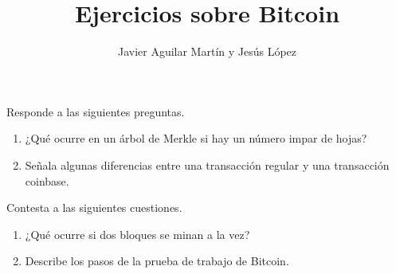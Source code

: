 \documentclass[twoside]{article}
\begin{document}
\title{Ejercicios sobre Bitcoin}
\author{Javier Aguilar Martín y Jesús López}
\maketitle


\begin{ejercicio}{1}
	Responde a las siguientes preguntas.
\begin{enumerate}
\item ¿Qué ocurre en un árbol de Merkle si hay un número impar de hojas?

\item Señala algunas diferencias entre una transacción regular y una transacción coinbase.
\end{enumerate}
\end{ejercicio}


\begin{ejercicio}{2}
	Contesta a las siguientes cuestiones.
	\begin{enumerate}
	\item  ¿Qué ocurre si dos bloques se minan a la vez?
	\item Describe los pasos de la prueba de trabajo de Bitcoin.
\end{enumerate}
\end{ejercicio}
\end{document}
